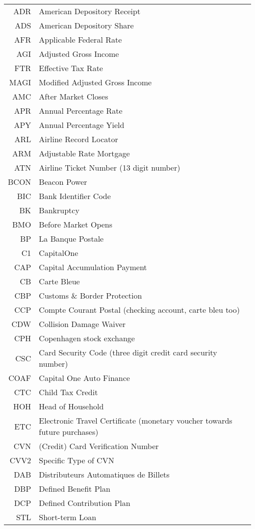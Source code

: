 \documentclass[12pt,twoside]{article}
\begin{document}
\begin{longtable}[>{\bfseries}l]{>{\ttfamily}r l}
ADR & American Depository Receipt \\
ADS & American Depository Share \\
AFR & Applicable Federal Rate \\
AGI & Adjusted Gross Income \\
FTR & Effective Tax Rate \\
MAGI & Modified Adjusted Gross Income \\
AMC & After Market Closes \\
APR & Annual Percentage Rate \\
APY & Annual Percentage Yield \\
ARL & Airline Record Locator \\
ARM & Adjustable Rate Mortgage \\
ATN & Airline Ticket Number (13 digit number) \\
BCON & Beacon Power \\
BIC & Bank Identifier Code \\
BK & Bankruptcy \\
BMO & Before Market Opens \\
BP & La Banque Postale \\
C1 & CapitalOne \\
CAP & Capital Accumulation Payment \\
CB & Carte Bleue \\
CBP & Customs \& Border Protection \\
CCP & Compte Courant Postal (checking account, carte bleu too) \\
CDW & Collision Damage Waiver \\
CPH & Copenhagen stock exchange \\
CSC & Card Security Code (three digit credit card security number) \\
COAF & Capital One Auto Finance \\
CTC & Child Tax Credit \\
HOH & Head of Household \\
ETC & Electronic Travel Certificate (monetary voucher towards future purchases) \\
CVN & (Credit) Card Verification Number \\
CVV2 & Specific Type of CVN \\
DAB & Distributeurs Automatiques de Billets \\
DBP & Defined Benefit Plan \\
DCP & Defined Contribution Plan \\
STL & Short-term Loan \\

\end{longtable}
\end{document}
